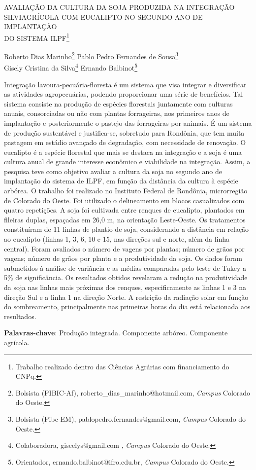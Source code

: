 \documentclass[article,12pt,onesidea,4paper,english,brazil]{abntex2}
\begin{document}
	
	
	\frenchspacing 
	
	\begin{center}
		\LARGE AVALIAÇÃO DA CULTURA DA SOJA PRODUZIDA NA INTEGRAÇÃO
		SILVIAGRÍCOLA COM EUCALIPTO NO SEGUNDO ANO DE IMPLANTAÇÃO\\DO SISTEMA ILPF\footnote{Trabalho realizado dentro das Ciências Agrárias com financiamento do CNPq.}
		
		\normalsize
		Roberto Dias Marinho\footnote{Bolsista (PIBIC-Af), roberto\_dias\_marinho@hotmail.com, \textit{Campus} Colorado do Oeste.} 
		Pablo Pedro Fernandes de Sousa\footnote{Bolsista (Pibc EM), pablopedro.fernandes@gmail.com, \textit{Campus} Colorado do Oeste.} \\
		Gisely Cristina da Silva\footnote{Colaboradora, giseelys@gmail.com , \textit{Campus} Colorado do Oeste.} 
		Ernando Balbinot\footnote{Orientador, ernando.balbinot@ifro.edu.br, \textit{Campus} Colorado do Oeste.} 
	\end{center}
	
	\noindent Integração lavoura-pecuária-floresta é um sistema que visa integrar e diversificar as atividades agropecuárias, podendo proporcionar uma série de benefícios. Tal
	sistema consiste na produção de espécies florestais juntamente com culturas
	anuais, consorciadas ou não com plantas forrageiras, nos primeiros anos de
	implantação e posteriormente o pastejo das forrageiras por animais. É um sistema
	de produção sustentável e justifica-se, sobretudo para Rondônia, que tem muita
	pastagem em estádio avançado de degradação, com necessidade de renovação. O
	eucalipto é a espécie florestal que mais se destaca na integração e a soja é uma
	cultura anual de grande interesse econômico e viabilidade na integração. Assim, a
	pesquisa teve como objetivo avaliar a cultura da soja no segundo ano de
	implantação do sistema de ILPF, em função da distância da cultura à espécie
	arbórea. O trabalho foi realizado no Instituto Federal de Rondônia, microrregião de
	Colorado do Oeste. Foi utilizado o delineamento em blocos casualizados com quatro
	repetições. A soja foi cultivada entre renques de eucalipto, plantados em fileiras
	duplas, espaçadas em 26,0 m, na orientação Leste-Oeste. Os tratamentos
	constituíram de 11 linhas de plantio de soja, considerando a distância em relação ao
	eucalipto (linhas 1, 3, 6, 10 e 15, nas direções sul e norte, além da linha central).
	Foram avaliados o número de vagens por plantas; número de grãos por vagens;
	número de grãos por planta e a produtividade da soja. Os dados foram submetidos à
	análise de variância e as médias comparadas pelo teste de Tukey a 5\% de
	significância. Os resultados obtidos revelaram a redução na produtividade da soja
	nas linhas mais próximas dos renques, especificamente as linhas 1 e 3 na direção
	Sul e a linha 1 na direção Norte. A restrição da radiação solar em função do
	sombreamento, principalmente nas primeiras horas do dia está relacionada aos
	resultados.
	
	\vspace{\onelineskip}
	
	\noindent
	\textbf{Palavras-chave}: Produção integrada. Componente arbóreo. Componente agrícola.
	
\end{document}
